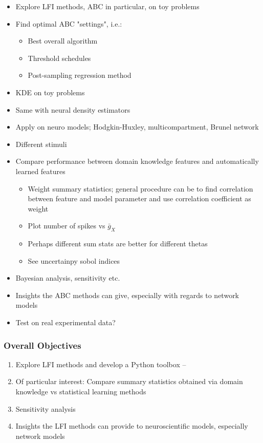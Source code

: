 \begin{itemize}
    \item Explore LFI methods, ABC in particular, on toy problems
    \item Find optimal ABC "settings", i.e.: 
    \begin{itemize}
        \item Best overall algorithm 
        \item Threshold schedules
        \item Post-sampling regression method 
    \end{itemize}
    \item KDE on toy problems
    \item Same with neural density estimators 
    \item Apply on neuro models; Hodgkin-Huxley, multicompartment, Brunel network
    \item Different stimuli 
    \item Compare performance between domain knowledge features and automatically learned features 
    \begin{itemize}
        \item Weight summary statistics; general procedure can be to find correlation between feature and model parameter and use correlation coefficient as weight
        \item Plot number of spikes vs $\bar{g}_X$
        \item Perhaps different sum stats are better for different thetas
        \item See uncertainpy sobol indices
    \end{itemize}
    \item Bayesian analysis, sensitivity etc. 
    \item Insights the ABC methods can give, especially with regards to network models
    \item Test on real experimental data?
\end{itemize}




\subsubsection{Overall Objectives} 

\begin{enumerate}
    \item Explore LFI methods and develop a Python toolbox -- 
    \item Of particular interest: Compare summary statistics obtained via domain knowledge vs statistical learning methods
    \item Sensitivity analysis
    \item Insights the LFI methods can provide to neuroscientific models, especially network models
\end{enumerate}

